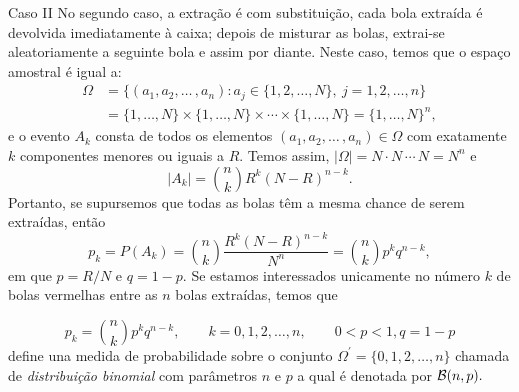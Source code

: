\begin{frame}
\begin{block}{Caso II}
No segundo caso, a extração é com substituição, cada bola extraída  é devolvida imediatamente à caixa; depois de misturar as bolas, extrai-se aleatoriamente a seguinte bola e  assim por diante. Neste caso, temos que o espaço amostral é igual a: 
$$
\begin{aligned}
\Omega &= \{(a_1, a_2, \ldots \, , a_n) : a_j \in \{1,2, \dots , N\},\ j= 1,2, \dots , n\}\\
&=\{1,\dots , N\}\times \{1, \dots , N\}\times \cdots \times\{1, \dots , N\} =\{1, \dots , N\}^n,  
\end{aligned}
$$
e o evento $A_k$ consta de todos os elementos $ (a_1, a_2, \ldots \, , a_n) \in \Omega$ com exatamente 
$k$ componentes menores ou iguais a $R$. Temos assim, $ \left| \Omega \right| =  N\cdot N \, \cdots \, N=N^n$ e $$\left|A_k \right|=\binom{n}{k}R^k(N-R)^{n-k}. $$ Portanto, se supursemos que todas as bolas têm a mesma chance de serem extraídas, então 
$$p_k=P(A_k)=\binom{n}{k}\frac{R^k(N-R)^{n-k}}{N^n}=\binom{n}{k}p^k q^{n-k},$$ em que $p=R/N$ e $q=1-p.$ 
Se estamos interessados unicamente no número $k$ de bolas vermelhas entre as $n$ bolas extraídas,  temos que

$$p_k= \binom{n}{k}p^k q^{n-k}, \qquad k=0,1,2,\dots , n, \qquad 0<p<1, q=1-p$$ define una medida de probabilidade sobre o conjunto 
$\Omega^\prime =\{0,1,2, \dots ,n\}$  chamada de  \textit{distribuição binomial} com parâmetros $n$ e $p$ a qual é denotada por ${\cal B}(n,p).$ 
\end{block}
\end{frame}



